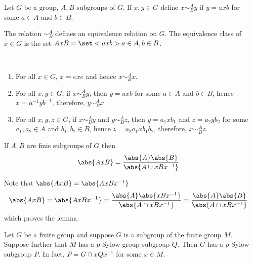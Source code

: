 \begin{definition}
    Let \(G\) be a group, \(A,B\) subgroups of \(G\). If \(x,y \in G\) define \(x \sim^A_B y\) if \(y = axb\) for some \(a \in A\) and \(b \in B\). 
\end{definition}

\begin{lemma}
    The relation \( \sim^A_B \) defines an equivalence relation on \(G\). The equivalence class of \(x \in G\) is the set \(AxB = \set<axb>{a \in A, b \in B}\).
\end{lemma}

\begin{prooflemma}
    \
    \begin{enumerate}
        \item For all \(x \in G\), \(x = exe\) and hence \(x \sim_B^A x\).
        \item For all \(x,y \in G\), if \(x \sim^A_B y\), then \(y = axb\) for some \(a \in A\) and \(b \in B\), hence \(x = a^{-1}y b^{-1}\), therefore, \(y \sim^A_B x\).
        \item For all \(x,y,z \in G\), if \(x \sim^A_B y\) and \(y \sim^A_B z\), then \(y = a_1xb_1\) and \(z = a_2yb_2\) for some \(a_1,a_2 \in A\) and \(b_1,b_2 \in B\), hence \(z = a_2a_1 x b_1b_2\), therefore, \(x \sim^A_B z\).
    \end{enumerate}

\end{prooflemma}

\begin{lemma}
    If \(A,B\) are finie subgroups of \(G\) then 
    \begin{equation*}
        \abs{AxB} = \dfrac{\abs{A} \abs{B}}{\abs{A \cup xBx^{-1}}}
    \end{equation*}
\end{lemma}

\begin{prooflemma}
    Note that \(\abs{AxB} = \abs{AxBx^{-1}}\)
    \begin{equation*}
        \abs{AxB} = \abs{AxBx^{-1}} = \dfrac{\abs{A} \abs{xBx^{-1}}}{\abs{A \cap xBx^{-1}}} =  \dfrac{\abs{A} \abs{B}}{\abs{A \cap xBx^{-1}}}
    \end{equation*}
    which proves the lemma.
\end{prooflemma}

\begin{lemma}
    Let \(G\) be a finite group and suppose \(G\) is a subgroup of the finite group \(M\). Suppose further that \(M\) has a \(p\)-Sylow group subgroup \(Q\). Then \(G\) has a \(p\)-Sylow subgroup \(P\). In fact, \(P = G \cap xQx^{-1}\) for some \(x \in M\).
\end{lemma}


